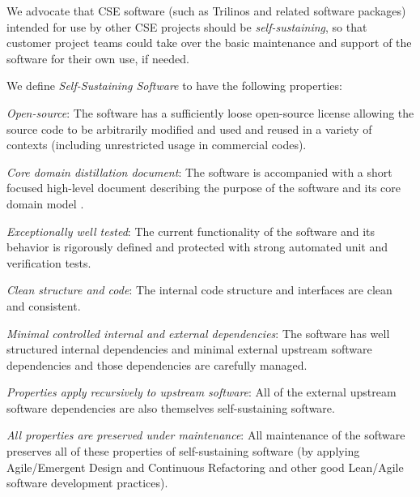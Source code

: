 \documentclass[11pt]{SANDreport}
\begin{document}
We advocate that CSE software (such as Trilinos and related software packages) intended for use by other CSE projects should be {}\textit{self-sustaining}, so that customer project teams could take over the basic maintenance and support of the software for their own use, if needed.

We define {}\textit{Self-Sustaining Software} to have the following properties:
%
\begin{compactitem}

{}\item\textit{Open-source}: The software has a sufficiently loose open-source license allowing the source code to be arbitrarily modified and used and reused in a variety of contexts (including unrestricted usage in commercial codes).

{}\item\textit{Core domain distillation document}: The software is accompanied with a short focused high-level document describing the purpose of the software and its core domain model {}\cite{DomainDrivenDesign}.

{}\item\textit{Exceptionally well tested}: The current functionality of the software and its behavior is rigorously defined and protected with strong automated unit and verification tests.

{}\item\textit{Clean structure and code}: The internal code structure and interfaces are clean and consistent.

{}\item\textit{Minimal controlled internal and external dependencies}: The software has well structured internal dependencies and minimal external upstream software dependencies and those dependencies are carefully managed.

{}\item\textit{Properties apply recursively to upstream software}: All of the external upstream software dependencies are also themselves self-sustaining software.

{}\item\textit{All properties are preserved under maintenance}: All maintenance of the software preserves all of these properties of self-sustaining software (by applying Agile/Emergent Design and Continuous Refactoring and other good Lean/Agile software development practices).

\end{compactitem}
\end{document}
